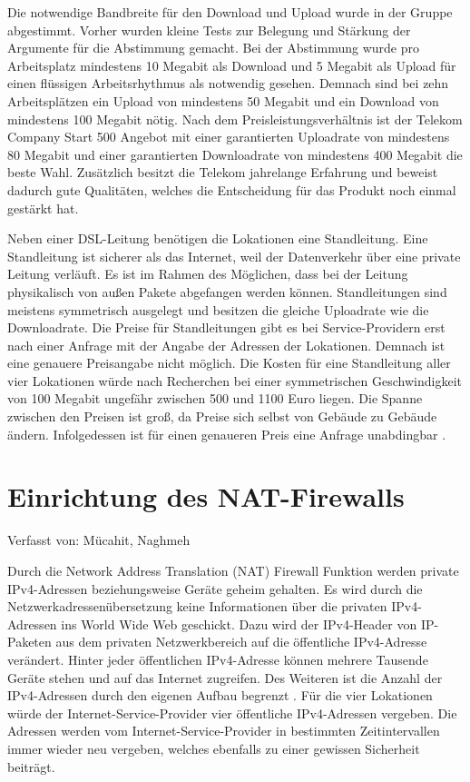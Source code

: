 \documentclass[fontsize=12pt,paper=a4,open=any,parskip=half,
  twoside=false,toc=listof,toc=bibliography,fleqn,leqno,
  captions=nooneline,captions=tableabove,british]{scrbook}
\begin{document}
\newpage
Die notwendige Bandbreite für den Download und Upload wurde in der Gruppe abgestimmt. Vorher wurden kleine Tests zur Belegung und Stärkung der Argumente für die Abstimmung gemacht. Bei der Abstimmung wurde pro Arbeitsplatz mindestens 10 Megabit als Download und 5 Megabit als Upload für einen flüssigen Arbeitsrhythmus als notwendig gesehen. Demnach sind bei zehn Arbeitsplätzen ein Upload von mindestens 50 Megabit und ein Download von mindestens 100 Megabit nötig. Nach dem Preisleistungsverhältnis ist der Telekom Company Start 500 \cite{companystart} Angebot mit einer garantierten Uploadrate von mindestens 80 Megabit und einer garantierten Downloadrate von mindestens 400 Megabit die beste Wahl. Zusätzlich besitzt die Telekom jahrelange Erfahrung und beweist dadurch gute Qualitäten, welches die Entscheidung für das Produkt noch einmal gestärkt hat.\par
Neben einer DSL-Leitung benötigen die Lokationen eine Standleitung. Eine Standleitung ist sicherer als das Internet, weil der Datenverkehr über eine private Leitung verläuft. Es ist im Rahmen des Möglichen, dass bei der Leitung physikalisch von außen Pakete abgefangen werden können. Standleitungen sind meistens symmetrisch ausgelegt und besitzen die gleiche Uploadrate wie die Downloadrate. Die Preise für Standleitungen gibt es bei Service-Providern erst nach einer Anfrage mit der Angabe der Adressen der Lokationen. Demnach ist eine genauere Preisangabe nicht möglich. Die Kosten für eine Standleitung aller vier Lokationen würde nach Recherchen bei einer symmetrischen Geschwindigkeit von 100 Megabit ungefähr zwischen 500 und 1100 Euro liegen. Die Spanne zwischen den Preisen ist groß, da Preise sich selbst von Gebäude zu Gebäude ändern. Infolgedessen ist für einen genaueren Preis eine Anfrage unabdingbar \cite{standleitung}.

\newpage
\section{Einrichtung des NAT-Firewalls}
{\tiny Verfasst von: Mücahit, Naghmeh\par}
Durch die Network Address Translation (NAT) Firewall Funktion werden private IPv4-Adressen beziehungsweise Geräte geheim gehalten. Es wird durch die Netzwerkadressenübersetzung keine Informationen über die privaten IPv4-Adressen ins World Wide Web geschickt. Dazu wird der IPv4-Header von IP-Paketen aus dem privaten Netzwerkbereich auf die öffentliche IPv4-Adresse verändert. Hinter jeder öffentlichen IPv4-Adresse können mehrere Tausende Geräte stehen und auf das Internet zugreifen. Des Weiteren ist die Anzahl der IPv4-Adressen durch den eigenen Aufbau begrenzt \cite{NATdef}. Für die vier Lokationen würde der Internet-Service-Provider vier öffentliche IPv4-Adressen vergeben. Die Adressen werden vom Internet-Service-Provider in bestimmten Zeitintervallen immer wieder neu vergeben, welches ebenfalls zu einer gewissen Sicherheit beiträgt.
\end{document}
